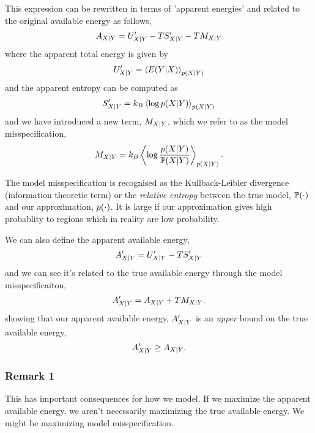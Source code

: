 \documentclass[]{article}
\begin{document}
This expression can be rewritten in terms of 'apparent energies' and
related to the original available energy as follows, 
\[
A_{X|Y} = U^\prime_{X|Y} - TS^\prime_{X|Y} - TM_{X|Y}
\] where the apparent total energy is given by \[
U^\prime_{X|Y} = \left\langle E(Y|X) \right\rangle_{p(X|Y) } 
\] and the apparent entropy can be computed as \[
S^\prime_{X|Y}=k_B\left\langle \log p(X|Y)  \right\rangle_{p(X|Y) }
\] and we have introduced a new term,
\(M_{X|Y}\), which we refer to as the model
misspecification, 
\[
M_{X|Y} = k_B \left\langle \log \frac{p(X| Y)}{\mathbb{P}(X|Y) } \right\rangle_{p(X|Y) }.
\]

The model misspecification is recognised as the Kullback-Leibler
divergence (information theoretic term) or the \emph{relative entropy}
between the true model, \(\mathbb{P}(\cdot)\) and our approximation,
\(p(\cdot)\). It is large if our approximation gives high
probablity to regions which in reality are low probability.

We can also define the apparent available energy, 
\[
A^\prime_{X|Y} = U^\prime_{X|Y} - TS^\prime_{X|Y}
\] 
and we can see it's related to the true available energy through the
model misspecificaiton, 
\[
A^\prime_{X|Y} = A_{X|Y} + TM_{X|Y}.
\] 
showing that our apparent available energy,
\(A^\prime_{X|Y}\) is an \emph{upper} bound
on the true available energy, 
\[
A^\prime_{X|Y} \geq A_{X|Y}.
\]

\hypertarget{remark-1}{%
\subsubsection{Remark 1}\label{remark-1}}

This has important consequences for how we model. If we maximize the
apparent available energy, we aren't necessarily maximizing the true
available energy. We might be maximizing model misspecification.
\end{document}
